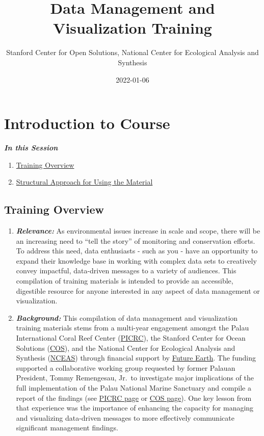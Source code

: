 \documentclass[
]{book}
\title{Data Management and Visualization Training}
\author{Stanford Center for Open Solutions, National Center for Ecological Analysis and Synthesis}
\date{2022-01-06}
\providecommand{\tightlist}{%
  \setlength{\itemsep}{0pt}\setlength{\parskip}{0pt}}
\begin{document}
\maketitle

{
\setcounter{tocdepth}{1}
\tableofcontents
}
\hypertarget{introduction-to-course}{%
\chapter{Introduction to Course}\label{introduction-to-course}}

\textbf{\emph{In this Session}}

\begin{enumerate}
\def\labelenumi{\arabic{enumi}.}
\tightlist
\item
  \protect\hyperlink{training-overview}{Training Overview}
\item
  \protect\hyperlink{how-to-use-these-materials}{Structural Approach for Using the Material}
\end{enumerate}

\hypertarget{training-overview}{%
\section{Training Overview}\label{training-overview}}

\begin{enumerate}
\def\labelenumi{\arabic{enumi}.}
\item
  \textbf{\emph{Relevance:}} As environmental issues increase in scale and scope, there will be an increasing need to ``tell the story'' of monitoring and conservation efforts. To address this need, data enthusiasts - such as you - have an opportunity to expand their knowledge base in working with complex data sets to creatively convey impactful, data-driven messages to a variety of audiences. This compilation of training materials is intended to provide an accessible, digestible resource for anyone interested in any aspect of data management or visualization.
\item
  \textbf{\emph{Background:}} This compilation of data management and visualization training materials stems from a multi-year engagement amongst the Palau International Coral Reef Center (\href{https://picrc.org/picrcpage/}{PICRC}), the Stanford Center for Ocean Solutions (\href{https://oceansolutions.stanford.edu/}{COS}), and the National Center for Ecological Analysis and Synthesis (\href{https://www.nceas.ucsb.edu/}{NCEAS}) through financial support by \href{https://futureearth.org/}{Future Earth}. The funding supported a collaborative working group requested by former Palauan President, Tommy Remengesau, Jr.~to investigate major implications of the full implementation of the Palau National Marine Sanctuary and compile a report of the findings (see \href{https://picrc.org/picrcpage/palau-national-marine-sanctuary/}{PICRC page} or \href{https://oceansolutions.stanford.edu/pnms-report}{COS page}). One key lesson from that experience was the importance of enhancing the capacity for managing and visualizing data-driven messages to more effectively communicate significant management findings.
\end{enumerate}
\end{document}
